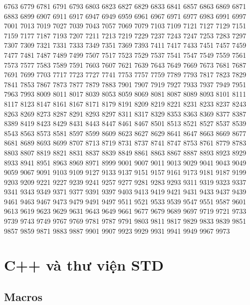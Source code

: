\documentclass[11pt]{article}
\begin{document}
\begin{vncode}
 6763  6779  6781  6791  6793  6803  6823  6827  6829  6833  6841  6857  6863  6869  6871
 6883  6899  6907  6911  6917  6947  6949  6959  6961  6967  6971  6977  6983  6991  6997
 7001  7013  7019  7027  7039  7043  7057  7069  7079  7103  7109  7121  7127  7129  7151
 7159  7177  7187  7193  7207  7211  7213  7219  7229  7237  7243  7247  7253  7283  7297
 7307  7309  7321  7331  7333  7349  7351  7369  7393  7411  7417  7433  7451  7457  7459
 7477  7481  7487  7489  7499  7507  7517  7523  7529  7537  7541  7547  7549  7559  7561
 7573  7577  7583  7589  7591  7603  7607  7621  7639  7643  7649  7669  7673  7681  7687
 7691  7699  7703  7717  7723  7727  7741  7753  7757  7759  7789  7793  7817  7823  7829
 7841  7853  7867  7873  7877  7879  7883  7901  7907  7919  7927  7933  7937  7949  7951
 7963  7993  8009  8011  8017  8039  8053  8059  8069  8081  8087  8089  8093  8101  8111
 8117  8123  8147  8161  8167  8171  8179  8191  8209  8219  8221  8231  8233  8237  8243
 8263  8269  8273  8287  8291  8293  8297  8311  8317  8329  8353  8363  8369  8377  8387
 8389  8419  8423  8429  8431  8443  8447  8461  8467  8501  8513  8521  8527  8537  8539
 8543  8563  8573  8581  8597  8599  8609  8623  8627  8629  8641  8647  8663  8669  8677
 8681  8689  8693  8699  8707  8713  8719  8731  8737  8741  8747  8753  8761  8779  8783
 8803  8807  8819  8821  8831  8837  8839  8849  8861  8863  8867  8887  8893  8923  8929
 8933  8941  8951  8963  8969  8971  8999  9001  9007  9011  9013  9029  9041  9043  9049
 9059  9067  9091  9103  9109  9127  9133  9137  9151  9157  9161  9173  9181  9187  9199
 9203  9209  9221  9227  9239  9241  9257  9277  9281  9283  9293  9311  9319  9323  9337
 9341  9343  9349  9371  9377  9391  9397  9403  9413  9419  9421  9431  9433  9437  9439
 9461  9463  9467  9473  9479  9491  9497  9511  9521  9533  9539  9547  9551  9587  9601
 9613  9619  9623  9629  9631  9643  9649  9661  9677  9679  9689  9697  9719  9721  9733
 9739  9743  9749  9767  9769  9781  9787  9791  9803  9811  9817  9829  9833  9839  9851
 9857  9859  9871  9883  9887  9901  9907  9923  9929  9931  9941  9949  9967  9973
\end{vncode}
\endgroup


\clearpage

\section{C++ và thư viện STD}

\subsection{Macros}
\end{document}
